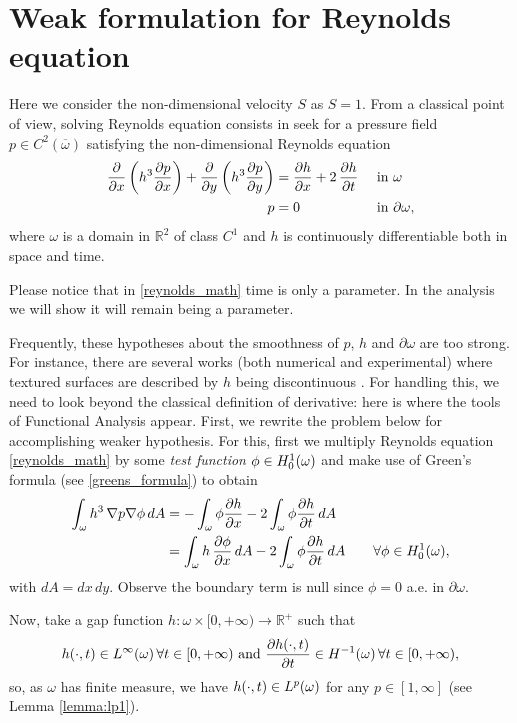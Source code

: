 \section{Weak formulation for Reynolds equation}\label{sec:weak_form_reynolds}
Here we consider the non-dimensional velocity $S$ as $S=1$. From a classical point of view, solving Reynolds equation consists in seek for a pressure field $p\in C^2(\overline{\omega})$ satisfying the non-dimensional Reynolds equation
\begin{align}
\frac{\partial}{\partial x}\left({h^3}\frac{\partial p}{\partial x}\right)+\frac{\partial}{\partial y}\left({h^3}\frac{\partial p}{\partial y}\right)&=\frac{\partial h}{\partial x}+2\,\parder{h}{t}&&\text{ in }\omega\label{eq:reynolds_math}\\
p&=0&&\text{ in }\partial \omega,\label{eq:reynolds_math_bound}
\end{align}
where $\omega$ is a domain in $\mathbb{R}^2$ of class $C^1$ and $h$ is continuously differentiable both in space and time.

Please notice that in \eqref{reynolds_math} time is only a parameter. In the analysis we will show it will remain being a parameter.

Frequently, these hypotheses about the smoothness of $p$, $h$ and $\partial \omega$ are too strong. For instance, there are several works (both numerical and experimental) where textured surfaces are described by $h$ being discontinuous \cite{zhang2012,yin2012,shen2013,checo2014a}. For handling this, we need to look beyond the classical definition of derivative: here is where the tools of Functional Analysis appear. First, we rewrite the problem below for accomplishing weaker hypothesis. For this, first we multiply Reynolds equation \eqref*{reynolds_math} by some \emph{test function} $\phi\in{H_0^1(\omega)}$ and make use of Green's formula (see \eqref{greens_formula}) to obtain
\begin{align}
\int_\omega h^3\,\nabla p \nabla \phi \,dA&=- \int_\omega \phi \frac{\partial h }{\partial x} -2 \int_\omega \phi\frac{\partial h }{\partial t}\,dA \nonumber\\
&=\int_\omega h\, \parder{\phi}{x}\,dA-2 \int_\omega\phi \frac{\partial h }{\partial t}\,dA \qquad \forall \phi\in \hzerooneom,\label{eq:reynolds_integral0}
\end{align}
with $dA=dx\,dy$. Observe the boundary term is null since $\phi=0$ a.e. in $\partial\omega$. 

Now, take a gap function $h:\omega\times[0,+\infty)\rightarrow \mathbb{R}^+$ such that
\begin{equation}
h(\cdot,t)\in \lpom{\infty}\,\forall t\in [0,+\infty)
\text{ and }\parder{h(\cdot,t)}{t}\in H^{-1}(\omega)\,\forall t\in [0,+\infty),\label{eq:reynolds_h_reg}
\end{equation}
so, as $\omega$ has finite measure, we have $h(\cdot,t)\in {L^{p}(\omega)}$ for any $p \in [1,\infty]$ (see Lemma \ref{lemma:lp1}).

